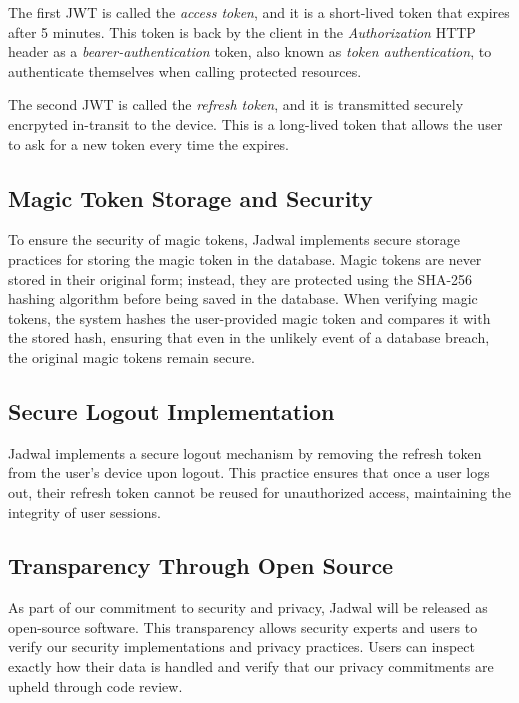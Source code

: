 The first JWT is called the \textit{access token}, and it is a short-lived token that expires after 5 minutes. This token is back by the client in the \textit{Authorization} HTTP header as a \textit{\gls{bearer-authentication}} token, also known as \textit{token authentication}, to authenticate themselves when calling protected resources.

The second JWT is called the \textit{refresh token}, and it is transmitted securely encrpyted in-transit to the device. This is a long-lived token that allows the user to ask for a new token every time the  expires.

\subsection{Magic Token Storage and Security}

To ensure the security of magic tokens, Jadwal implements secure storage practices for storing the magic token in the database. Magic tokens are never stored in their original form; instead, they are protected using the SHA-256 hashing algorithm before being saved in the database. When verifying magic tokens, the system hashes the user-provided magic token and compares it with the stored hash, ensuring that even in the unlikely event of a database breach, the original magic tokens remain secure.

\subsection{Secure Logout Implementation}

Jadwal implements a secure logout mechanism by removing the refresh token from the user's device upon logout. This practice ensures that once a user logs out, their refresh token cannot be reused for unauthorized access, maintaining the integrity of user sessions.

\subsection{Transparency Through Open Source}

As part of our commitment to security and privacy, Jadwal will be released as open-source software. This transparency allows security experts and users to verify our security implementations and privacy practices. Users can inspect exactly how their data is handled and verify that our privacy commitments are upheld through code review.



